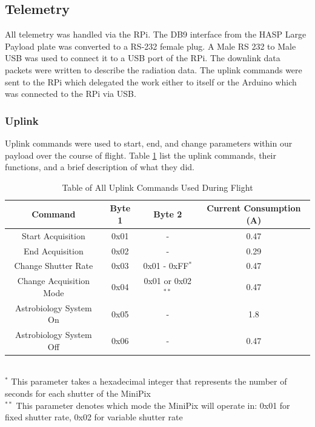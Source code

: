 \subsection{Telemetry}
\label{sec:Telemetry}

All telemetry was handled via the RPi. The DB9 interface from the HASP Large Payload plate was converted to a 
RS-232 female plug. A Male RS 232 to Male USB was used to connect it to a USB port of the RPi. 
The downlink data packets were written to describe the radiation data. 
The uplink commands were sent to the RPi which delegated the work either to itself or the Arduino which 
was connected to the RPi via USB.

\subsubsection{Uplink}
\label{sec:Uplink} 
Uplink commands were used to start, end, and change parameters within our payload over the course of flight. 
Table \ref{tab:All-Commands} list the uplink commands, their functions, and a brief description of what they did. 

\begin{table}[H]
\centering
\caption{Table of All Uplink Commands Used During Flight}
\label{tab:All-Commands}
\bigskip
\begin{tabular}{c|c|c|c}
\hline
\hline
\multicolumn{1}{c|}{\bfseries Command} & \multicolumn{1}{c|}{\bfseries Byte 1} &  \multicolumn{1}{c|}{\bfseries Byte 2} & \multicolumn{1}{c}{\bfseries Current Consumption (A)} \\
\hline
	Start Acquisition  		& 0x01	& -	 					& 0.47    \\ \hline
	End Acquisition 		& 0x02	& -	 					& 0.29    \\ \hline
	Change Shutter Rate 	& 0x03 	& 0x01 - 0xFF$^*$		& 0.47 		\\ \hline
	Change Acquisition Mode	& 0x04	& 0x01 or 0x02$^{**}$	& 0.47		\\ \hline
	Astrobiology System On	& 0x05	& -						& 1.8			\\ \hline
	Astrobiology System Off	& 0x06	& -						& 0.47		\\ \hline
\end{tabular}
\\
\footnotesize
$^{*}$ 	This parameter takes a hexadecimal integer that represents the number of seconds for each shutter of the MiniPix \\
$^{**}$	This parameter denotes which mode the MiniPix will operate in: 0x01 for fixed shutter rate, 0x02 for variable shutter rate
\end{table}

